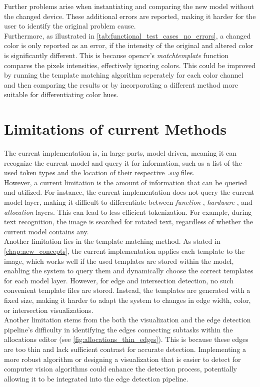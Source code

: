Further problems arise when instantiating and comparing the new model without the changed device. These additional errors are reported, making it harder for the user to identify the original problem cause.\\
Furthermore, as illustrated in \autoref{tab:functional_test_cases_no_errors}, a changed color is only reported as an error, if the intensity of the original and altered color is significantly different. This is because \acrshort{opencv}'s \textit{matchtemplate} function compares the pixels intensities, effectively ignoring colors. This could be improved by running the template matching algorithm seperately for each color channel and then comparing the results or by incorporating a different method more suitable for differentiating color hues.

\section{Limitations of current Methods}
The current implementation is, in large parts, model driven, meaning it can recognize the current model and query it for information, such as a list of the used token types and the location of their respective \textit{.svg} files.\\
However, a current limitation is the amount of information that can be queried and utilized. For instance, the current implementation does not query the current model layer, making it difficult to differentiate between \textit{function}-, \textit{hardware}-, and \textit{allocation} layers. This can lead to less efficient tokenization. For example, during text recognition, the image is searched for rotated text, regardless of whether the current model contains any.\\
Another limitation lies in the template matching method. As stated in \autoref{chap:new_concepts}, the current implementation applies each template to the image, which works well if the used templates are stored within the model, enabling the system to query them and dynamically choose the correct templates for each model layer. However, for edge and intersection detection, no such convenient template files are stored. Instead, the templates are generated with a fixed size, making it harder to adapt the system to changes in edge width, color, or intersection visualizations.\\
Another limitation stems from the both the visualization and the edge detection pipeline's difficulty in identifying the edges connecting subtasks within the allocations editor (see \autoref{fig:allocations_thin_edges}). This is because these edges are too thin and lack sufficient contrast for accurate detection. Implementing a more robust algorithm or designing a visualization that is easier to detect for computer vision algorithms could enhance the detection process, potentially allowing it to be integrated into the edge detection pipeline.\\

